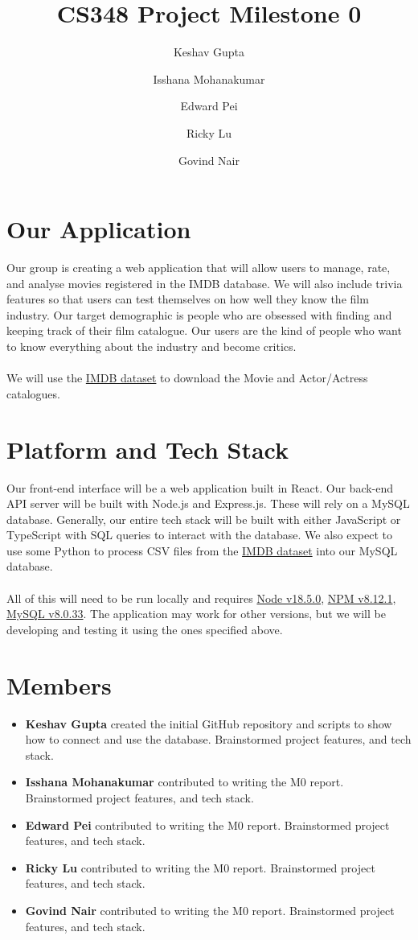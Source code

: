 \documentclass[12pt, a4paper]{article}
\title{CS348 Project Milestone 0}
\author{Keshav Gupta\and Isshana Mohanakumar \and Edward Pei \and Ricky Lu \and Govind Nair}
\begin{document}
\maketitle

\section*{Our Application}
Our group is creating a web application that will allow users to manage, rate, and analyse movies registered in the IMDB database. We will also include trivia features so that users can test themselves on how well they know the film industry. Our target demographic is people who are obsessed with finding and keeping track of their film catalogue. Our users are the kind of people who want to know everything about the industry and become critics.\\\\We will use the \href{https://datasets.imdbws.com/}{IMDB dataset} to download the Movie and Actor/Actress catalogues. 

\section*{Platform and Tech Stack}
Our front-end interface will be a web application built in React. Our back-end API server will be built with Node.js and Express.js. These will rely on a MySQL database. Generally, our entire tech stack will be built with either JavaScript or TypeScript with SQL queries to interact with the database. We also expect to use some Python to process CSV files from the \href{https://datasets.imdbws.com/}{IMDB dataset} into our MySQL database.\\\\All of this will need to be run locally and requires \href{https://nodejs.org/en/download}{Node v18.5.0}, \href{https://nodejs.org/en/download}{NPM v8.12.1}, \href{https://dev.mysql.com/downloads/mysql/}{MySQL v8.0.33}. The application may work for other versions, but we will be developing and testing it using the ones specified above.

\section*{Members}
\begin{itemize}
    \item \textbf{Keshav Gupta} created the initial GitHub repository and scripts to show how to connect and use the database. Brainstormed project features, and tech stack.
    \item \textbf{Isshana Mohanakumar} contributed to writing the M0 report. Brainstormed project features, and tech stack.
    \item \textbf{Edward Pei} contributed to writing the M0 report. Brainstormed project features, and tech stack.
    \item \textbf{Ricky Lu} contributed to writing the M0 report. Brainstormed project features, and tech stack.
    \item \textbf{Govind Nair} contributed to writing the M0 report. Brainstormed project features, and tech stack.

\end{itemize}
\end{document}
